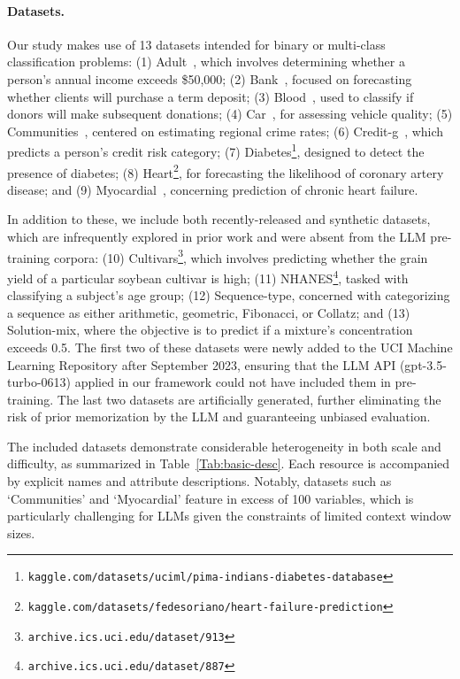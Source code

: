 \paragraph{Datasets.}
Our study makes use of 13 datasets intended for binary or multi-class classification problems: (1) Adult~\cite{asuncion2007uci}, which involves determining whether a person's annual income exceeds \$50,000; (2) Bank~\cite{moro2014data}, focused on forecasting whether clients will purchase a term deposit; (3) Blood~\cite{yeh2009knowledge}, used to classify if donors will make subsequent donations; (4) Car~\cite{kadra2021well}, for assessing vehicle quality; (5) Communities~\cite{misc_communities_and_crime_183}, centered on estimating regional crime rates; (6) Credit-g~\cite{kadra2021well}, which predicts a person's credit risk category; (7) Diabetes\footnote{\texttt{kaggle.com/datasets/uciml/pima-indians-diabetes-database}}, designed to detect the presence of diabetes; (8) Heart\footnote{\texttt{kaggle.com/datasets/fedesoriano/heart-failure-prediction}}, for forecasting the likelihood of coronary artery disease; and (9) Myocardial~\cite{misc_myocardial_infarction_complications_579}, concerning prediction of chronic heart failure.

In addition to these, we include both recently-released and synthetic datasets, which are infrequently explored in prior work and were absent from the LLM pre-training corpora: (10) Cultivars\footnote{\texttt{archive.ics.uci.edu/dataset/913}}, which involves predicting whether the grain yield of a particular soybean cultivar is high; (11) NHANES\footnote{\texttt{archive.ics.uci.edu/dataset/887}}, tasked with classifying a subject’s age group; (12) Sequence-type, concerned with categorizing a sequence as either arithmetic, geometric, Fibonacci, or Collatz; and (13) Solution-mix, where the objective is to predict if a mixture’s concentration exceeds 0.5. The first two of these datasets were newly added to the UCI Machine Learning Repository after September 2023, ensuring that the LLM API (gpt-3.5-turbo-0613) applied in our framework could not have included them in pre-training. The last two datasets are artificially generated, further eliminating the risk of prior memorization by the LLM and guaranteeing unbiased evaluation.

The included datasets demonstrate considerable heterogeneity in both scale and difficulty, as summarized in Table~\ref{Tab:basic-desc}. Each resource is accompanied by explicit names and attribute descriptions. Notably, datasets such as `Communities' and `Myocardial' feature in excess of 100 variables, which is particularly challenging for LLMs given the constraints of limited context window sizes.

